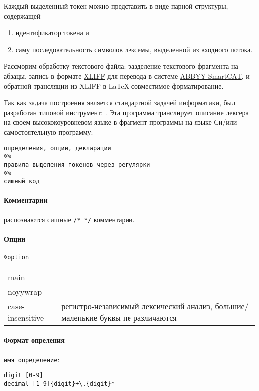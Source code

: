 \bigskip
Каждый выделенный токен можно представить в виде парной структуры,
содержащей
\begin{enumerate}
  \item идентификатор токена и
  \item саму последовательность символов лексемы, выделенной из входного
потока.
\end{enumerate}

\bigskip
Рассморим обработку текстового файла: разделение текстового фрагмента на абзацы,
запись в формате
\href{http://docs.oasis-open.org/xliff/xliff-core/xliff-core.html}{XLIFF} для
перевода в системе \href{http://smartcat.pro}{ABBYY SmartCAT}, и обратной
трансляции из XLIFF в \LaTeX-совместимое форматирование.

\bigskip
Так как задача построения  является стандартной задачей информатики, был разработан типовой
инструмент:  . Эта программа
транслирует описание лексера на своем высококоуровневом языке в фрагмент
программы на языке Си/\cpp или самостоятельную программу:

\begin{verbatim}
определения, опции, декларации
%%
правила выделения токенов через регулярки
%%
сишный код
\end{verbatim}

\paragraph{Комментарии} распознаются сишные \verb|/* */| комментарии.

\paragraph{Опции} \verb|%option|

\bigskip\noindent
\begin{tabular}{l l}
main & \\
noyywrap & \\
case-insensitive & регистро-независимый лексический анализ, большие/маленькие
буквы не различаются \\
\end{tabular}

\paragraph{Формат опреления} \verb|имя определение|:
\begin{verbatim}
digit [0-9]
decimal [1-9]{digit}+\.{digit}*
\end{verbatim}


